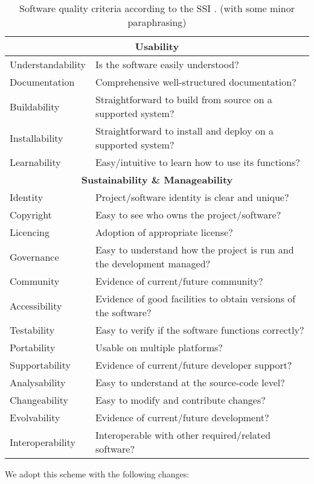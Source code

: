 \documentclass[a4paper,11pt]{article}
\begin{document}
\begin{table}[hbt]
\begin{tabular}{l|l}
\hline
\multicolumn{2}{c}{\textbf{Usability}} \\
\hline
Understandability & Is the software easily understood? \\ 
Documentation & Comprehensive well-structured documentation? \\
Buildability  & Straightforward to build from source on a supported system? \\
Installability  & Straightforward to install and deploy on a supported system? \\
Learnability & Easy/intuitive to learn how to use its functions? \\
\hline
\multicolumn{2}{c}{\textbf{Sustainability \& Manageability}} \\
\hline
Identity & Project/software identity is clear and unique? \\
Copyright & Easy to see who owns the project/software? \\
Licencing & Adoption of appropriate license? \\
Governance & Easy to understand how the project is run and the development managed? \\
Community & Evidence of current/future community? \\
Accessibility & Evidence of good facilities to obtain versions of the software? \\
Testability & Easy to verify if the software functions correctly? \\
Portability & Usable on multiple platforms? \\
Supportability & Evidence of current/future developer support? \\
Analysability & Easy to understand at the source-code level? \\
Changeability & Easy to modify and contribute changes? \\
Evolvability & Evidence of current/future development? \\
Interoperability & Interoperable with other required/related software? \\
\hline
\end{tabular}
\caption{Software quality criteria according to the SSI \citep{SSIGUIDE}. (with some minor paraphrasing)}
\label{tab:criteria}
\end{table}

We adopt this scheme with the following changes:
\end{document}

